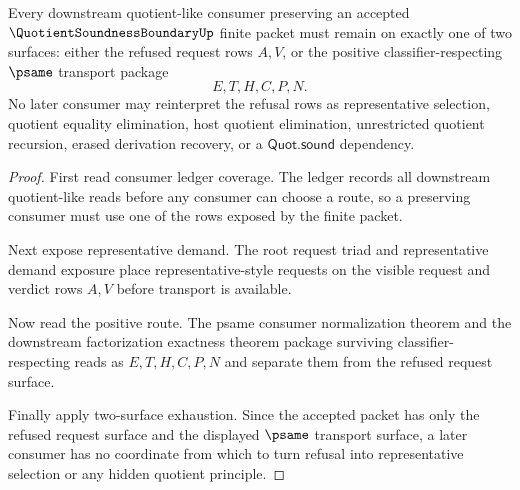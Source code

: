 \begin{theorem}
\label{thm:quotient-soundness-boundary-consumer-refusal-exactness}
Every downstream quotient-like consumer preserving an accepted $\QuotientSoundnessBoundaryUp$ finite packet must remain on exactly one of two surfaces: either the refused request rows $A,V$, or the positive classifier-respecting $\psame$ transport package
$$
E,T,H,C,P,N.
$$
No later consumer may reinterpret the refusal rows as representative selection, quotient equality elimination, host quotient elimination, unrestricted quotient recursion, erased derivation recovery, or a $\mathsf{Quot.sound}$ dependency.
\end{theorem}
\begin{proof}
First read consumer ledger coverage. The ledger records all downstream quotient-like reads before any consumer can choose a route, so a preserving consumer must use one of the rows exposed by the finite packet.

Next expose representative demand. The root request triad and representative demand exposure place representative-style requests on the visible request and verdict rows $A,V$ before transport is available.

Now read the positive route. The psame consumer normalization theorem and the downstream factorization exactness theorem package surviving classifier-respecting reads as $E,T,H,C,P,N$ and separate them from the refused request surface.

Finally apply two-surface exhaustion. Since the accepted packet has only the refused request surface and the displayed $\psame$ transport surface, a later consumer has no coordinate from which to turn refusal into representative selection or any hidden quotient principle.
\end{proof}

